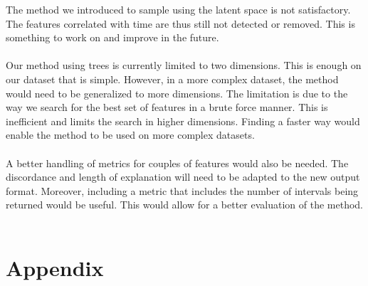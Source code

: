 \documentclass[oneside, a4paper, onecolumn, 11pt]{article}
\begin{document}
The method we introduced to sample using the latent space is not satisfactory. The features correlated with time are thus still not detected or removed. This is something to work on and improve in the future.\\\\
Our method using trees is currently limited to two dimensions. This is enough on our dataset that is simple. However, in a more complex dataset, the method would need to be generalized to more dimensions. The limitation is due to the way we search for the best set of features in a brute force manner. This is inefficient and limits the search in higher dimensions. Finding a faster way would enable the method to be used on more complex datasets.\\\\
A better handling of metrics for couples of features would also be needed. The discordance and length of explanation will need to be adapted to the new output format. Moreover, including a metric that includes the number of intervals being returned would be useful. This would allow for a better evaluation of the method.\\\\
\newpage



\newpage
\appendix

\section{Appendix}
\label{sec:appendix}
\end{document}
